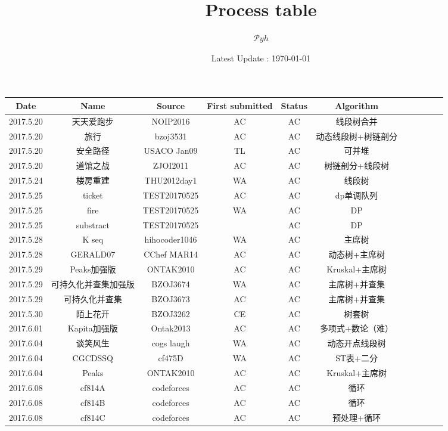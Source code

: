 \documentclass[landscape]{article}
\date{Latest Update : \today}
\title{Process table}
\author{$\mathcal Pyh$}
\begin{document}
\maketitle

\begin{longtable}{ccccccccccc}
  \hline
  Date & Name & Source & First submitted & Status & Algorithm\\
  \hline
  2017.5.20 & 天天爱跑步 & NOIP2016 & AC & AC & 线段树合并\\
  \hline
  2017.5.20 & 旅行 & bzoj3531 & AC & AC & 动态线段树+树链剖分\\
  \hline
  2017.5.20 & 安全路径 & USACO Jan09 & TL & AC & 可并堆\\
  \hline
  2017.5.20 & 道馆之战 & ZJOI2011 & AC & AC & 树链剖分+线段树\\
  \hline
  2017.5.24 & 楼房重建 & THU2012day1 & WA & AC & 线段树\\
  \hline
  2017.5.25 & ticket & TEST20170525 & AC & AC & dp单调队列\\
  \hline
  2017.5.25 & fire & TEST20170525 & WA & AC & DP\\
  \hline
  2017.5.25 & substract & TEST20170525 & & AC & DP\\
  \hline
  2017.5.28 & K seq & hihocoder1046 & WA & AC & 主席树\\
  \hline
  2017.5.28 & GERALD07 & CChef MAR14 & AC & AC & 动态树+主席树\\
  \hline
  2017.5.29 & Peaks加强版 & ONTAK2010 & AC & AC & Kruskal+主席树\\
  \hline
  2017.5.29 & 可持久化并查集加强版 & BZOJ3674 & WA & AC & 主席树+并查集\\
  \hline
  2017.5.29 & 可持久化并查集 & BZOJ3673 & AC & AC & 主席树+并查集\\
  \hline
  2017.5.30 & 陌上花开 & BZOJ3262 & CE & AC & 树套树\\
  \hline
  2017.6.01 & Kapita加强版 & Ontak2013 & AC & AC & 多项式+数论（难）\\
  \hline
  2017.6.04 & 谈笑风生 & cogs laugh & WA & AC & 动态开点线段树\\
  \hline
  2017.6.04 & CGCDSSQ & cf475D & WA & AC & ST表+二分\\
  \hline
  2017.6.04 & Peaks & ONTAK2010 & AC & AC & Kruskal+主席树\\
  \hline
  2017.6.08 & cf814A & codeforces & AC & AC & 循环\\
  \hline
  2017.6.08 & cf814B & codeforces & AC & AC & 循环\\
  \hline
  2017.6.08 & cf814C & codeforces & AC & AC & 预处理+循环\\

\end{longtable}
\end{document}
